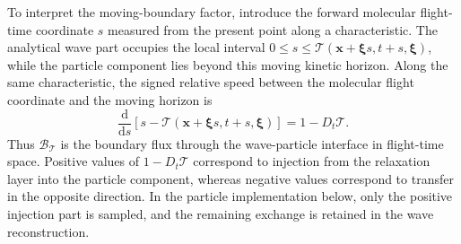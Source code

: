 \documentclass[preprint,12pt]{elsarticle}
\begin{document}
To interpret the moving-boundary factor, introduce the forward molecular flight-time coordinate $s$ measured from the present point along a characteristic. The analytical wave part occupies the local interval $0\le s\le \mathcal{T}(\boldsymbol{x}+\boldsymbol{\xi} s,t+s,\boldsymbol{\xi})$, while the particle component lies beyond this moving kinetic horizon. Along the same characteristic, the signed relative speed between the molecular flight coordinate and the moving horizon is
\begin{equation}\label{eq:horizon_relative_speed}
    \frac{\mathrm{d}}{\mathrm{d} s}\left[
    s-\mathcal{T}(\boldsymbol{x}+\boldsymbol{\xi} s,t+s,\boldsymbol{\xi})
    \right]
    =
    1-D_t \mathcal{T} .
\end{equation}
Thus $\mathcal B_\mathcal{T}$ is the boundary flux through the wave-particle interface in flight-time space. Positive values of $1-D_t \mathcal{T}$ correspond to injection from the relaxation layer into the particle component, whereas negative values correspond to transfer in the opposite direction. In the particle implementation below, only the positive injection part is sampled, and the remaining exchange is retained in the wave reconstruction.
\end{document}
